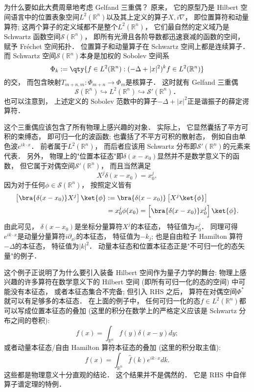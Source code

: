     为什么要如此大费周章地考虑 Gelfand 三重偶？ 原来， 它的原型乃是 Hilbert 空间语言中的位置表象空间$L^2(\mathbb{R}^n)$以及其上定义的算子$X,i\nabla$， 即位置算符和动量算符; 这两个算子的定义域都不是整个$L^2(\mathbb{R}^n)$， 它们最自然的定义域乃是 Schwartz 函数空间$\mathcal{S}(\mathbb{R}^n)$， 即所有光滑且各阶导数都迅速衰减的函数的空间， 赋予 Fréchet 空间拓扑． 位置算子和动量算子在 Schwartz 空间上都是连续算子． 而 Schwartz 空间$\mathcal{S}(\mathbb{R}^n)$本身是加权的 Sobolev 空间系
$$
\Phi_k := \qty{f \in L^2 (\mathbb{R}^n): (-\Delta + |x|^ 2)^{k} f \in L^2 (\mathbb{R}^n) }
$$
的交， 而包含映射$T_{m+n,m}:\Phi_{m+n}\to\Phi_m$是核算子． 这时就有 Gelfand 三重偶$$
\mathcal{S}(\mathbb{R}^n)\hookrightarrow L^2(\mathbb{R}^n)\hookrightarrow \mathcal{S}'(\mathbb{R}^n)．
$$也可以注意到， 上述定义的 Sobolev 范数中的算子$-\Delta+|x|^2$正是谐振子的薛定谔算符．

    这个三重偶应该包含了所有物理上感兴趣的对象． 实际上， 它显然囊括了平方可积的束缚态， 即可归一化的波函数; 也囊括了不平方可积的散射态， 例如自由单色波$e^{ik\cdot x}$． 前者属于$L^2(\mathbb{R}^n)$， 而后者应该用 Schwartz 分布即$\mathcal{S}'(\mathbb{R}^n)$的元素来代表． 另外， 物理上的"位置本征态"即$\delta(x-x_0)$显然并不是数学意义下的函数， 但它属于对偶空间$\mathcal{S}'(\mathbb{R}^n)$， 而且当然满足
$$
X^j\delta(x-x_0)=x_0^j,
$$
因为对于任何$\phi\in\mathcal{S}(\mathbb{R}^n)$， 按照定义皆有
$$
\begin{aligned}
\left[\bra{\delta(x-x_0)}X^j\right]\ket{\phi}
&:=\bra{\delta(x-x_0)}\left[X^j\ket{\phi}\right]\\
&=x_0^j\phi(x_0)
=\left[\bra{\delta(x-x_0)}x_0^j\right]\ket{\phi}.
\end{aligned}
$$
由此可见， $\delta(x-x_0)$是坐标分量算符$X^j$的本征态， 特征值为$x_0^j$． 同理可得$e^{ik\cdot x}$是动量分量算符$i\partial_{x^j}$的本征态， 特征值为$-k_j$; 也是自由粒子 Hamilton 算符$-\Delta$的本征态， 特征值为$|k|^2$． 动量本征态和位置本征态正是"不可归一化的态矢量"的例子． 

    这个例子正说明了为什么要引入装备 Hilbert 空间作为量子力学的舞台: 物理上感兴趣的许多算符在数学意义下的 Hilbert 空间 (即所有可归一化的态的空间) 中可能没有本征态， 或者本征态集合不完备; 但引入 RHS 之后， 算符在对偶空间$\Phi^*$就可以有足够多的本征态． 在上面的例子中， 任何可归一化的态$f\in{L^2}(\mathbb{R}^n)$都可以写成位置本征态的叠加 (这里的积分在数学上的严格定义应该是 Schwartz 分布之间的卷积):
$$
f(x)=\int_{\mathbb{R}^n}f(y)\delta(x-y)dy;
$$    
或者动量本征态/自由 Hamilton 算符本征态的叠加 (这里的积分取主值):
$$
f(x)=\int_{\mathbb{R}^n}\hat f(k)e^{ik\cdot x}dk.
$$
这些都是物理意义十分直观的结论． 这个结果并不是偶然的． 它是 RHS 中自伴算子谱定理的特例．
